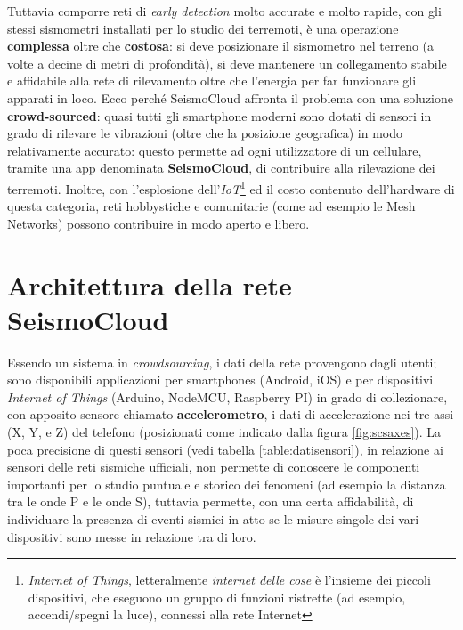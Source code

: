 \documentclass[a4paper,10pt]{memoir}
\begin{document}
Tuttavia comporre reti di \textit{early detection} molto accurate e molto rapide, con gli stessi sismometri installati per lo studio dei terremoti, è una operazione \textbf{complessa} oltre che \textbf{costosa}: si deve posizionare il sismometro nel terreno (a volte a decine di metri di profondità), si deve mantenere un collegamento stabile e affidabile alla rete di rilevamento oltre che l'energia per far funzionare gli apparati in loco. Ecco perché SeismoCloud affronta il problema con una soluzione \textbf{crowd-sourced}: quasi tutti gli smartphone moderni sono dotati di sensori in grado di rilevare le vibrazioni (oltre che la posizione geografica) in modo relativamente accurato\cite{eewapp}: questo permette ad ogni utilizzatore di un cellulare, tramite una app denominata \textbf{SeismoCloud}, di contribuire alla rilevazione dei terremoti. Inoltre, con l'esplosione dell'\textit{IoT}\footnote{\textit{Internet of Things}, letteralmente \textit{internet delle cose} è l'insieme dei piccoli dispositivi, che eseguono un gruppo di funzioni ristrette (ad esempio, accendi/spegni la luce), connessi alla rete Internet} ed il costo contenuto dell'hardware di questa categoria, reti hobbystiche e comunitarie (come ad esempio le Mesh Networks) possono contribuire in modo aperto e libero.

\pagebreak
%
%

\section{Architettura della rete SeismoCloud}

Essendo un sistema in \textit{crowdsourcing}, i dati della rete provengono dagli utenti; sono disponibili applicazioni per smartphones (Android, iOS) e per dispositivi \textit{Internet of Things} (Arduino, NodeMCU, Raspberry PI) in grado di collezionare, con apposito sensore chiamato \textbf{accelerometro}, i dati di accelerazione nei tre assi (X, Y, e Z) del telefono (posizionati come indicato dalla figura \ref{fig:scsaxes}). La poca precisione di questi sensori (vedi tabella \ref{table:datisensori}), in relazione ai sensori delle reti sismiche ufficiali, non permette di conoscere le componenti importanti per lo studio puntuale e storico dei fenomeni (ad esempio la distanza tra le onde P e le onde S), tuttavia permette, con una certa affidabilità, di individuare la presenza di eventi sismici in atto se le misure singole dei vari dispositivi sono messe in relazione tra di loro.
\end{document}
